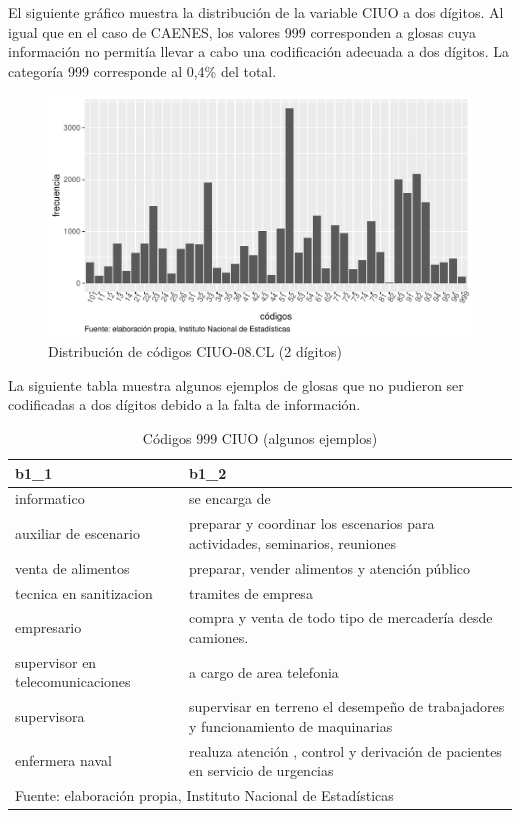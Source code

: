 \documentclass[
  12pt,
  spanish,
]{article}
\begin{document}
El siguiente gráfico muestra la distribución de la variable CIUO a dos
dígitos. Al igual que en el caso de CAENES, los valores 999 corresponden
a glosas cuya información no permitía llevar a cabo una codificación
adecuada a dos dígitos. La categoría 999 corresponde al 0,4\% del total.

\begin{figure}[H]
\centering
\large
\caption{Distribución de códigos CIUO-08.CL (2 dígitos)}
\label{ciuo_distancia}
\includegraphics[width = \linewidth]{imagenes/distribucion_ciuo.pdf}
\normalsize
\end{figure}

La siguiente tabla muestra algunos ejemplos de glosas que no pudieron
ser codificadas a dos dígitos debido a la falta de información.

\begin{table}[H]

\caption{\label{tab:glosas 999 ciuo}\label{missing_ciuo_ejemplos}Códigos 999 CIUO (algunos ejemplos)}
\centering
\fontsize{9.5}{11.5}\selectfont
\begin{tabular}[t]{ll}
\toprule
b1\_1 & b1\_2\\
\midrule
informatico & se encarga de\\
auxiliar de escenario & preparar y coordinar los escenarios para actividades, seminarios, reuniones\\
venta de alimentos & preparar, vender alimentos y atención público\\
tecnica en sanitizacion & tramites de empresa\\
empresario & compra y venta de todo tipo de mercadería desde camiones.\\
\addlinespace
supervisor en telecomunicaciones & a cargo de  area telefonia\\
supervisora & supervisar en terreno el desempeño de trabajadores y funcionamiento de maquinarias\\
enfermera naval & realuza atención , control y derivación de pacientes en servicio de urgencias\\
\bottomrule
\multicolumn{2}{l}{\rule{0pt}{1em}Fuente: elaboración propia, Instituto Nacional de Estadísticas }\\
\end{tabular}
\end{table}
\end{document}

